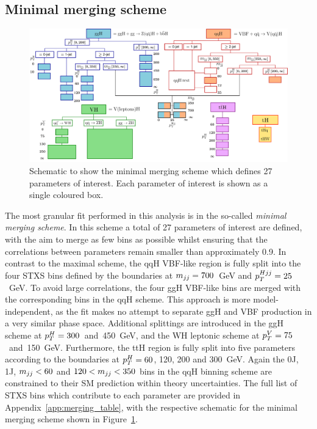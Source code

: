 \FloatBarrier

\subsection{Minimal merging scheme}
\begin{figure}[htb!]
  \centering
  \includegraphics[width=.9\linewidth]{Figures/app_merging_schemes/allSTXSbins_minimal.pdf}
  \caption[Schematic of the minimal merging scheme]
  {
    Schematic to show the minimal merging scheme which defines 27 parameters of interest. Each parameter of interest is shown as a single coloured box.
  }
  \label{fig:minimal_scheme}
\end{figure}

The most granular fit performed in this analysis is in the so-called \textit{minimal merging scheme}. In this scheme a total of 27 parameters of interest are defined, with the aim to merge as few bins as possible whilst ensuring that the correlations between parameters remain smaller than approximately 0.9. In contrast to the maximal scheme, the qqH VBF-like region is fully split into the four STXS bins defined by the boundaries at ${m_{jj}=700}$~GeV and $p_T^{Hjj}=25$~GeV. To avoid large correlations, the four ggH VBF-like bins are merged with the corresponding bins in the qqH scheme. This approach is more model-independent, as the fit makes no attempt to separate ggH and VBF production in a very similar phase space. Additional splittings are introduced in the ggH scheme at $p_T^H=300$~and~450~GeV, and the WH leptonic scheme at $p_T^V=75$~and~150~GeV. Furthermore, the ttH region is fully split into five parameters according to the boundaries at $p_T^H=60$, 120, 200 and 300~GeV. Again the 0J, 1J, $m_{jj}<60$ and $120<m_{jj}<350$ bins in the qqH binning scheme are constrained to their SM prediction within theory uncertainties. The full list of STXS bins which contribute to each parameter are provided in Appendix~\ref{app:merging_table}, with the respective schematic for the minimal merging scheme shown in Figure~\ref{fig:minimal_scheme}.

